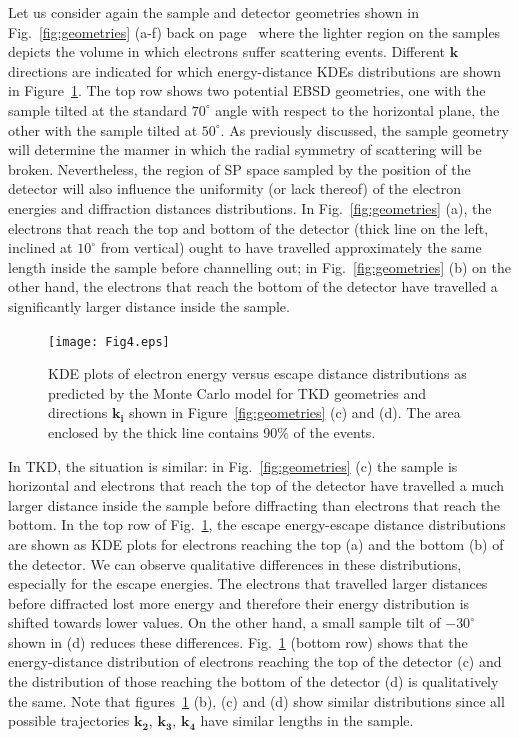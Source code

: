 Let us consider again the sample and detector geometries shown in Fig.~\ref{fig:geometries} (a-f) back on page~\pageref{fig:geometries} where the lighter region on the samples depicts the volume in which electrons suffer scattering events.  Different $\mathbf{k}$ directions are indicated for which energy-distance KDEs distributions are shown in Figure~\ref{fig:ks}.  The top row shows two potential EBSD geometries, one with the sample tilted at the standard $70^{\circ}$ angle with respect to the horizontal plane, the other with the sample tilted at $50^{\circ}$. As previously discussed, the sample geometry will determine the manner in which the radial symmetry of scattering will be broken. Nevertheless, the region of SP space sampled by the position of the detector will also influence the uniformity (or lack thereof) of the electron energies and diffraction distances distributions. In Fig.~\ref{fig:geometries} (a), the electrons that reach the top and bottom of the detector (thick line on the left, inclined at $10^{\circ}$ from vertical) ought to have travelled approximately the same length inside the sample before channelling out; in Fig.~\ref{fig:geometries} (b) on the other hand, the electrons that reach the bottom of the detector have travelled a significantly larger distance inside the sample. 

\begin{figure}[ht]
\centering
\texttt{[image: Fig4.eps]}%
\caption[KDE plots of electron energy versus escape distance distributions]{KDE plots of electron energy versus escape distance distributions as predicted by the Monte Carlo model for TKD geometries and directions $\mathbf{k_i}$ shown in Figure~\ref{fig:geometries} (c) and (d). The area enclosed by the thick line contains 90$\%$ of the events.}
\label{fig:ks}
\end{figure}

In TKD, the situation is similar: in Fig.~\ref{fig:geometries} (c) the sample is horizontal and electrons that reach the top of the detector have travelled a much larger distance inside the sample before diffracting than electrons that reach the bottom. In the top row of Fig.~\ref{fig:ks}, the escape energy-escape distance distributions are shown as KDE plots for electrons reaching the top (a) and the bottom (b) of the detector. We can observe qualitative differences in these distributions, especially for the escape energies. The electrons that travelled larger distances before diffracted lost more energy and therefore their energy distribution is shifted towards lower values. On the other hand, a small sample tilt of $-30^{\circ}$ shown in (d) reduces these differences. Fig.~\ref{fig:ks} (bottom row) shows that the energy-distance distribution of electrons reaching the top of the detector (c) and the distribution of those reaching the bottom of the detector (d) is qualitatively the same. Note that figures~\ref{fig:ks} (b), (c) and (d) show similar distributions since all possible trajectories $\mathbf{k_2}$, $\mathbf{k_3}$, $\mathbf{k_4}$ have similar lengths in the sample.

